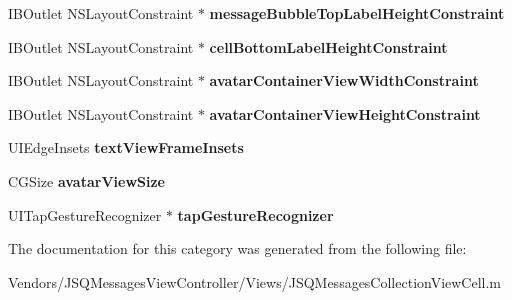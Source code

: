 \begin{DoxyCompactItemize}
\item 
\hypertarget{category_j_s_q_messages_collection_view_cell_07_08_a89c51a9db41037de136006c4d86c30dc}{}I\+B\+Outlet N\+S\+Layout\+Constraint $\ast$ {\bfseries message\+Bubble\+Top\+Label\+Height\+Constraint}\label{category_j_s_q_messages_collection_view_cell_07_08_a89c51a9db41037de136006c4d86c30dc}

\item 
\hypertarget{category_j_s_q_messages_collection_view_cell_07_08_af8262336645aaf38844579b71a2a75ce}{}I\+B\+Outlet N\+S\+Layout\+Constraint $\ast$ {\bfseries cell\+Bottom\+Label\+Height\+Constraint}\label{category_j_s_q_messages_collection_view_cell_07_08_af8262336645aaf38844579b71a2a75ce}

\item 
\hypertarget{category_j_s_q_messages_collection_view_cell_07_08_a4908c996482eb9f2f76fb6d9b5ae11c9}{}I\+B\+Outlet N\+S\+Layout\+Constraint $\ast$ {\bfseries avatar\+Container\+View\+Width\+Constraint}\label{category_j_s_q_messages_collection_view_cell_07_08_a4908c996482eb9f2f76fb6d9b5ae11c9}

\item 
\hypertarget{category_j_s_q_messages_collection_view_cell_07_08_a55648301bc21af39ab73ec90aa74dee7}{}I\+B\+Outlet N\+S\+Layout\+Constraint $\ast$ {\bfseries avatar\+Container\+View\+Height\+Constraint}\label{category_j_s_q_messages_collection_view_cell_07_08_a55648301bc21af39ab73ec90aa74dee7}

\item 
\hypertarget{category_j_s_q_messages_collection_view_cell_07_08_a607cdbb605be7598260d888cca5bb6d5}{}U\+I\+Edge\+Insets {\bfseries text\+View\+Frame\+Insets}\label{category_j_s_q_messages_collection_view_cell_07_08_a607cdbb605be7598260d888cca5bb6d5}

\item 
\hypertarget{category_j_s_q_messages_collection_view_cell_07_08_af84fae2addb5c5826929a727c90f1e69}{}C\+G\+Size {\bfseries avatar\+View\+Size}\label{category_j_s_q_messages_collection_view_cell_07_08_af84fae2addb5c5826929a727c90f1e69}

\item 
\hypertarget{category_j_s_q_messages_collection_view_cell_07_08_a24c55656097661012c05a57fcd7f816a}{}U\+I\+Tap\+Gesture\+Recognizer $\ast$ {\bfseries tap\+Gesture\+Recognizer}\label{category_j_s_q_messages_collection_view_cell_07_08_a24c55656097661012c05a57fcd7f816a}

\end{DoxyCompactItemize}


The documentation for this category was generated from the following file\+:\begin{DoxyCompactItemize}
\item 
Vendors/\+J\+S\+Q\+Messages\+View\+Controller/\+Views/J\+S\+Q\+Messages\+Collection\+View\+Cell.\+m\end{DoxyCompactItemize}
